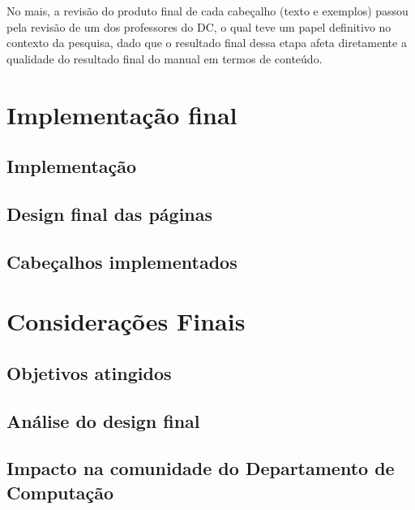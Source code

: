 \documentclass{article}
\begin{document}
No mais, a revisão do produto final de cada cabeçalho (texto e exemplos) passou pela revisão de um dos professores do \ac{DC}, o qual teve um papel definitivo no contexto da pesquisa, dado que o resultado final dessa etapa afeta diretamente a qualidade do resultado final do manual em termos de conteúdo.

\section{Implementação final}
\subsection{Implementação}
\subsection{Design final das páginas}
\subsection{Cabeçalhos implementados}

\section{Considerações Finais}
\subsection{Objetivos atingidos}
\subsection{Análise do design final}
\subsection{Impacto na comunidade do Departamento de Computação}
\end{document}
